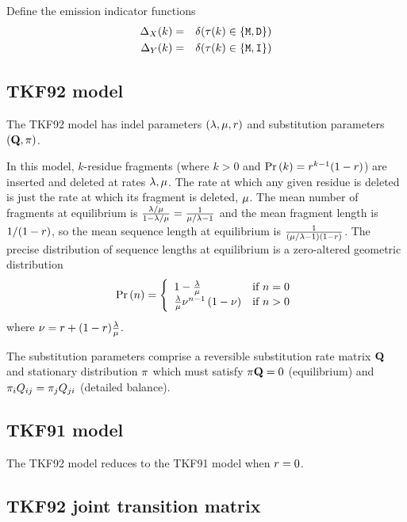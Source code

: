 \documentclass{article}
\newcommand\prob[1]{\mbox{Pr}\left( #1 \right)}
\newcommand\seclabel[1]{\label{sec:#1}}
\begin{document}
Define the emission indicator functions
\begin{eqnarray*}
\Delta_{X}(k) & = & \delta(\tau(k) \in \{ {\tt M}, {\tt D} \}) \\
\Delta_{Y}(k) & = & \delta(\tau(k) \in \{ {\tt M}, {\tt I} \})
\end{eqnarray*}

\subsection{TKF92 model}

The TKF92 model has indel parameters $(\lambda,\mu,r)$ and substitution parameters $({\bf Q},\pi)$.

In this model,
$k$-residue fragments (where $k>0$ and $\prob{k} = \fragext^{k-1}(1-\fragext)$) are inserted and deleted at rates $\lambda,\mu$.
The rate at which any given residue is deleted
is just the rate at which its fragment is deleted, $\mu$.
The mean number of fragments at equilibrium is
$\frac{\lambda/\mu}{1-\lambda/\mu} = \frac{1}{\mu/\lambda - 1}$
and the mean fragment length is $1/(1-r)$,
so the mean sequence length at equilibrium is 
$\frac{1}{(\mu/\lambda - 1)(1 - r)}$.
The precise distribution of sequence lengths at equilibrium is 
a zero-altered geometric distribution
\[
\prob{n} = \left\{
\begin{array}{ll}
1 - \frac{\insrate}{\delrate} & \mbox{if $n=0$} \\
\frac{\insrate}{\delrate} \nu^{n-1} \left( 1 - \nu \right) & \mbox{if $n>0$}
\end{array}
\right.
\]
where
$\nu = r + (1-r)\frac{\lambda}{\mu}$.


The substitution parameters comprise a reversible substitution rate matrix ${\bf Q}$ and stationary distribution $\pi$
which must satisfy $\pi {\bf Q} = 0$ (equilibrium)
and $\pi_i Q_{ij} = \pi_j Q_{ji}$ (detailed balance).

\subsection{TKF91 model}

The TKF92 model reduces to the TKF91 model when $r=0$.

\subsection{TKF92 joint transition matrix}
\seclabel{tkfjointmatrix}
\end{document}
